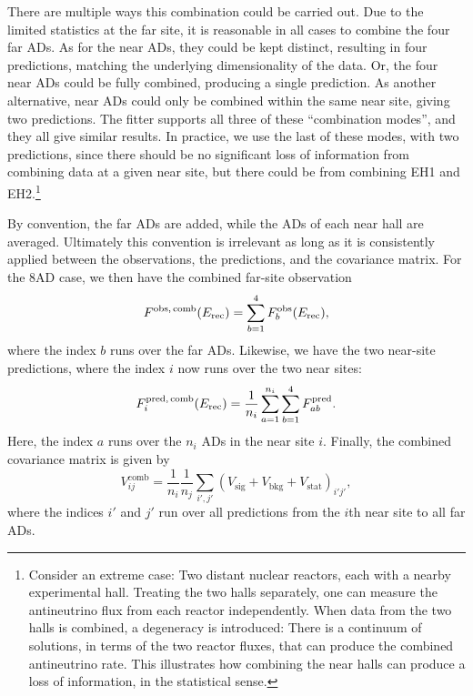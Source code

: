 \documentclass[../thesis.tex]{subfiles}
\begin{document}
There are multiple ways this combination could be carried out. Due to the limited statistics at the far site, it is reasonable in all cases to combine the four far ADs. As for the near ADs, they could be kept distinct, resulting in four predictions, matching the underlying dimensionality of the data. Or, the four near ADs could be fully combined, producing a single prediction. As another alternative, near ADs could only be combined within the same near site, giving two predictions. The fitter supports all three of these ``combination modes'', and they all give similar results. In practice, we use the last of these modes, with two predictions, since there should be no significant loss of information from combining data at a given near site, but there could be from combining EH1 and EH2.\footnote{Consider an extreme case: Two distant nuclear reactors, each with a nearby experimental hall. Treating the two halls separately, one can measure the antineutrino flux from each reactor independently. When data from the two halls is combined, a degeneracy is introduced: There is a continuum of solutions, in terms of the two reactor fluxes, that can produce the combined antineutrino rate. This illustrates how combining the near halls can produce a loss of information, in the statistical sense.}

By convention, the far ADs are added, while the ADs of each near hall are averaged. Ultimately this convention is irrelevant as long as it is consistently applied between the observations, the predictions, and the covariance matrix. For the 8AD case, we then have the combined far-site observation
\begin{equation}
  F^{\mathrm{obs},\,\mathrm{comb}}(E_\mathrm{rec}) = \sum_{b=1}^4 F^{\mathrm{obs}}_b(E_\mathrm{rec}),
\end{equation}
where the index $b$ runs over the far ADs. Likewise, we have the two near-site predictions, where the index $i$ now runs over the two near sites:
\begin{equation}
  F^{\mathrm{pred},\,\mathrm{comb}}_i (E_\mathrm{rec}) = \frac{1}{n_i} \sum_{a=1}^{n_i} \sum_{b=1}^4 F^{\mathrm{pred}}_{ab}.
\end{equation}
Here, the index $a$ runs over the $n_i$ ADs in the near site $i$. Finally, the combined covariance matrix is given by
\begin{equation}
  \label{eq:fitCovmatSum}
  V^{\mathrm{comb}}_{ij} = \frac{1}{n_i} \frac{1}{n_j} \sum_{i',j'} (V_{\mathrm{sig}} + V_{\mathrm{bkg}} + V_{\mathrm{stat}})_{i'j'},
\end{equation}
where the indices $i'$ and $j'$ run over all predictions from the $i$th near site to all far ADs.
\end{document}
